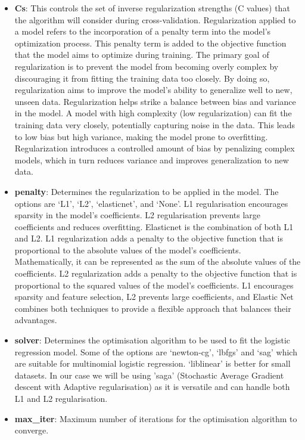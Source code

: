 \begin{itemize}
    \item \textbf{Cs}: This controls the set of inverse regularization strengths (C values) that the algorithm will consider during cross-validation. Regularization applied to a model refers to the incorporation of a penalty term into the model's optimization process. This penalty term is added to the objective function that the model aims to optimize during training. The primary goal of regularization is to prevent the model from becoming overly complex by discouraging it from fitting the training data too closely. By doing so, regularization aims to improve the model's ability to generalize well to new, unseen data. Regularization helps strike a balance between bias and variance in the model. A model with high complexity (low regularization) can fit the training data very closely, potentially capturing noise in the data. This leads to low bias but high variance, making the model prone to overfitting. Regularization introduces a controlled amount of bias by penalizing complex models, which in turn reduces variance and improves generalization to new data.
    \item \textbf{penalty}: Determines the regularization to be applied in the model. The options are `L1', `L2', `elasticnet', and `None'. L1 regularisation encourages sparsity in the model's coefficients. L2 regularisation prevents large coefficients and reduces overfitting. Elasticnet is the combination of both L1 and L2.
    L1 regularization adds a penalty to the objective function that is proportional to the absolute values of the model's coefficients. Mathematically, it can be represented as the sum of the absolute values of the coefficients. L2 regularization adds a penalty to the objective function that is proportional to the squared values of the model's coefficients. L1 encourages sparsity and feature selection, L2 prevents large coefficients, and Elastic Net combines both techniques to provide a flexible approach that balances their advantages.
    \item \textbf{solver}: Determines the optimisation algorithm to be used to fit the logistic regression model. Some of the options are `newton-cg', `lbfgs' and `sag' which are suitable for multinomial logistic regression. `liblinear' is better for small datasets. In our case we will be using 'saga' (Stochastic Average Gradient descent with Adaptive regularisation) as it is versatile and can handle both L1 and L2 regularisation.
    \item \textbf{max\_iter}: Maximum number of iterations for the optimisation algorithm to converge.
\end{itemize}

